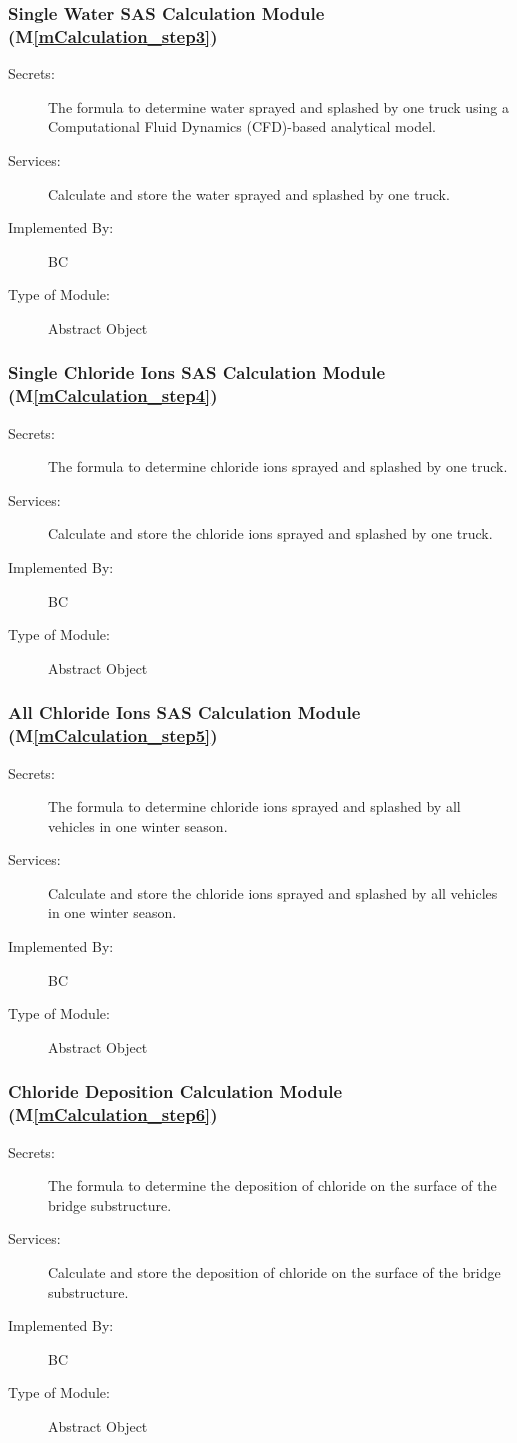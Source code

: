 \documentclass[12pt, titlepage]{article}
\newcommand{\mref}[1]{M\ref{#1}}
\begin{document}
\subsubsection{Single Water SAS Calculation Module (\mref{mCalculation_step3})}
\begin{description}
\item[Secrets:] The formula to determine water sprayed and splashed by one truck using a Computational Fluid Dynamics (CFD)-based analytical model.
\item[Services:] Calculate and store the water sprayed and splashed by one truck.
\item[Implemented By:] BC
\item[Type of Module:] Abstract Object
\end{description}

\subsubsection{Single Chloride Ions SAS Calculation Module (\mref{mCalculation_step4})}
\begin{description}
\item[Secrets:] The formula to determine chloride ions sprayed and splashed by one truck.
\item[Services:] Calculate and store the chloride ions sprayed and splashed by one truck.
\item[Implemented By:] BC
\item[Type of Module:] Abstract Object
\end{description}

\subsubsection{All Chloride Ions SAS Calculation Module (\mref{mCalculation_step5})}
\begin{description}
\item[Secrets:] The formula to determine chloride ions sprayed and splashed by all vehicles in one winter season.
\item[Services:] Calculate and store the chloride ions sprayed and splashed by all vehicles in one winter season.
\item[Implemented By:] BC
\item[Type of Module:] Abstract Object
\end{description}

\subsubsection{Chloride Deposition Calculation Module (\mref{mCalculation_step6})}
\begin{description}
\item[Secrets:] The formula to determine the deposition of chloride on the surface of the bridge substructure.
\item[Services:] Calculate and store the deposition of chloride on the surface of the bridge substructure.
\item[Implemented By:] BC
\item[Type of Module:] Abstract Object
\end{description}
\end{document}
